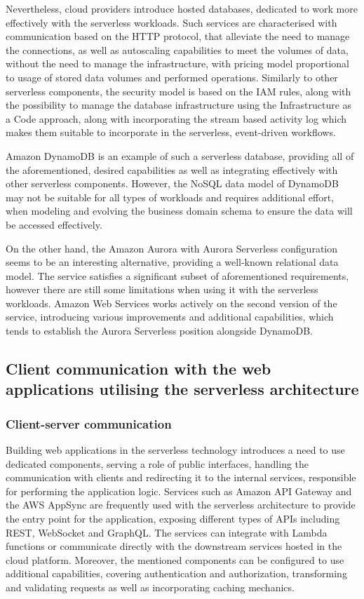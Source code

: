 Nevertheless, cloud providers introduce hosted databases, dedicated to work more effectively with the serverless workloads.
Such services are characterised with communication based on the HTTP protocol, that alleviate the need to manage the connections, as well as autoscaling capabilities to meet the volumes of data, without the need to manage the infrastructure, with pricing model proportional to usage of stored data volumes and performed operations.
Similarly to other serverless components, the security model is based on the IAM rules, along with the possibility to manage the database infrastructure using the Infrastructure as a Code approach, along with incorporating the stream based activity log which makes them suitable to incorporate in the serverless, event-driven workflows.

Amazon DynamoDB is an example of such a serverless database, providing all of the aforementioned, desired capabilities as well as integrating effectively with other serverless components.
However, the NoSQL data model of DynamoDB may not be suitable for all types of workloads and requires additional effort, when modeling and evolving the business domain schema to ensure the data will be accessed effectively.

On the other hand, the Amazon Aurora with Aurora Serverless configuration seems to be an interesting alternative, providing a well-known relational data model.
The service satisfies a significant subset of aforementioned requirements, however there are still some limitations when using it with the serverless workloads.
Amazon Web Services works actively on the second version of the service, introducing various improvements and additional capabilities, which tends to establish the Aurora Serverless position alongside DynamoDB.

\subsection{Client communication with the web applications utilising the serverless architecture}

\subsubsection{Client-server communication}

Building web applications in the serverless technology introduces a need to use dedicated components, serving a role of public interfaces, handling the communication with clients and redirecting it to the internal services, responsible for performing the application logic.
Services such as Amazon API Gateway and the AWS AppSync are frequently used with the serverless architecture to provide the entry point for the application, exposing different types of APIs including REST, WebSocket and GraphQL.
The services can integrate with Lambda functions or communicate directly with the downstream services hosted in the cloud platform. 
Moreover, the mentioned components can be configured to use additional capabilities, covering authentication and authorization, transforming and validating requests as well as incorporating caching mechanics.

